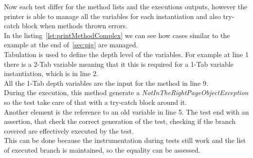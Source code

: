 Now each test differ for the method lists and the executions outputs, however the printer is able to manage all the variables for each instantiation and also try-catch block when methods thrown errors.\\
In the listing~\ref{lst:printMethodComplex} we can see how cases similar to the example at the end of~\ref{sec:pig} are managed.\\
Tabulation is used to define the depth level of the variables. For example at line 1 there is a 2-Tab variable meaning that it this is required for a 1-Tab variable instantiation, which is in line 2.\\
All the 1-Tab depth variables are the input for the method in line 9.\\
During the execution, this method generate a \emph{NotInTheRightPageObjectException} so the test take care of that with a try-catch block around it.\\
Another element is the reference to an old variable in line 5.
The test end with an assertion, that check the correct generation of the test, checking if the branch covered are effectively executed by the test.\\
This can be done because the instrumentation during tests still work and the list of executed branch is maintained, so the equality can be assessed.\\
